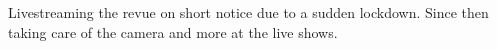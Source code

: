 
Livestreaming the revue on short notice due to a sudden lockdown. Since then taking care of the
camera and more at the live shows.
